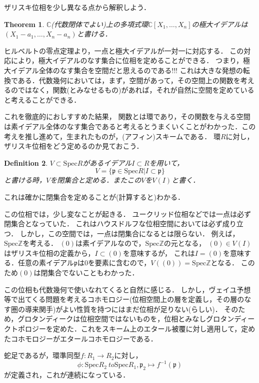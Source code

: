 \documentclass{ujarticle}
\newtheorem{thm}{Theorem}[section]
\newtheorem{dfn}[thm]{Definition}
\begin{document}
ザリスキ位相を少し異なる点から解釈しよう．
\begin{thm}
 $\mathbb{C}$(代数閉体でよい)上の多項式環$\mathbb{C}[X_1,\dots,X_n]$の極大イデアルは$(X_1 -a_1, \dots ,X_n - a_n)$と書ける．
\end{thm}

ヒルベルトの零点定理より，一点と極大イデアルが一対一に対応する．
この対応により，極大イデアルのなす集合に位相を定めることができる．
つまり，極大イデアル全体のなす集合を空間だと思えるのである!!!
これは大きな発想の転換である．代数幾何においては，まず，空間があって，その空間上の関数を考えるのではなく，関数(とみなせるもの)があれば，それが自然に空間を定めていると考えることができる．

これを徹底的におしすすめた結果，
関数とは環であり，その関数を与える空間は素イデアル全体のなす集合であると考えるとうまくいくことがわかった．この考えを推し進めて，生まれたものが，(アフィン)スキームである．
環$R$に対し，ザリスキ位相をどう定めるのか見ておこう．
\begin{dfn}
 $V \subset \mathrm{Spec}R$があるイデアル$I \subset R$を用いて，
\begin{equation*}
   V = \{ \mathfrak{p} \in \mathrm{Spec}R |  I \subset \mathfrak{p} \}
\end{equation*}
と書ける時，$V$を閉集合と定める．またこの$V$を$V(I)$と書く．
\end{dfn}
これは確かに閉集合を定めることが(計算すると)わかる．

この位相では，少し変なことが起きる．
ユークリッド位相などでは一点は必ず閉集合となっていた．
これはハウスドルフな位相空間においては必ず成り立つ．
しかし，この空間では，一点は閉集合になるとは限らない．
例えば，$\mathrm{Spec}\mathbb{Z}$を考える．
$(0)$は素イデアルなので，$\mathrm{Spec}\mathbb{Z}$の元となる，
$(0) \in V(I)$はザリスキ位相の定義から，$I \subset (0)$を意味するが，
これは$I = (0)$を意味する．任意の素イデアル$\mathfrak{p}$は$0$を要素に含むので，$V((0))=\mathrm{Spec}\mathbb{Z}$となる．
このため$(0)$は閉集合でないこともわかった．

この位相も代数幾何で使いなれてくると自然に感じる．
しかし，ヴェイユ予想等で出てくる問題を考えるコホモロジー(位相空間上の層を定義し，その層のなす圏の導来関手)がよい性質を持つにはまだ位相が足りない(らしい)．
そのため，グロタンディークは位相空間ではないものを，位相とみなしグロタンディークトポロジーを定めた．これをスキーム上のエタール被覆に対し適用して，定めたコホモロジーがエタールコホモロジーである．


蛇足であるが，環準同型$f:R_1 \to R_2$に対し，
\begin{equation*}
  \phi:\mathrm{Spec}R_2 \ to \mathrm{Spec}R_1,　\mathfrak{p}_2 \mapsto f^{-1}(\mathfrak{p})
\end{equation*}が定義され，これが連続になっている．
\end{document}
